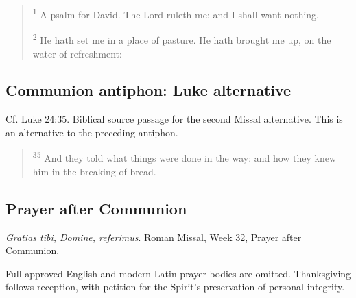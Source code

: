 \begin{quote}
\textsuperscript{1} A psalm for David. The Lord ruleth me: and I shall want nothing.

\textsuperscript{2} He hath set me in a place of pasture. He hath brought me up, on the water of refreshment:
\end{quote}


\subsection{Communion antiphon: Luke alternative}
\label{proper-communion-luke}
Cf. Luke 24:35. Biblical source passage for the second Missal alternative. This is an alternative to the preceding antiphon.

\begin{quote}
\textsuperscript{35} And they told what things were done in the way: and how they knew him in the breaking of bread.
\end{quote}


\subsection{Prayer after Communion}
\label{proper-after-communion}
\textit{Gratias tibi, Domine, referimus}. Roman Missal, Week 32, Prayer after Communion.

Full approved English and modern Latin prayer bodies are omitted. Thanksgiving follows reception, with petition for the Spirit's preservation of personal integrity.
